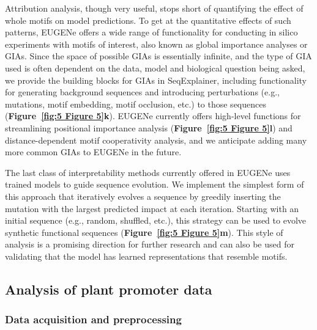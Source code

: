 Attribution analysis, though very useful, stops short of quantifying the effect of whole motifs on model predictions. To get at the quantitative effects of such patterns, EUGENe offers a wide range of functionality for conducting in silico experiments with motifs of interest\cite{De_Almeida2022-aa,Avsec2021-sw}, also known as global importance analyses or GIAs\cite{Koo2021-ly}. Since the space of possible GIAs is essentially infinite, and the type of GIA used is often dependent on the data, model and biological question being asked, we provide the building blocks for GIAs in SeqExplainer, including functionality for generating background sequences and introducing perturbations (e.g., mutations, motif embedding, motif occlusion, etc.) to those sequences (\textbf{Figure~\ref{fig:5 Figure 5}\textbf{k}}). EUGENe currently offers high-level functions for streamlining positional importance analysis (\textbf{Figure~\ref{fig:5 Figure 5}\textbf{l}}) and distance-dependent motif cooperativity analysis, and we anticipate adding many more common GIAs to EUGENe in the future.

The last class of interpretability methods currently offered in EUGENe uses trained models to guide sequence evolution. We implement the simplest form of this approach that iteratively evolves a sequence by greedily inserting the mutation with the largest predicted impact at each iteration. Starting with an initial sequence (e.g., random, shuffled, etc.), this strategy can be used to evolve synthetic functional sequences\cite{Taskiran2022-zj} (\textbf{Figure~\ref{fig:5 Figure 5}\textbf{m}}). This style of analysis is a promising direction for further research and can also be used for validating that the model has learned representations that resemble motifs.

\subsection{Analysis of plant promoter data}

\subsubsection{Data acquisition and preprocessing}

